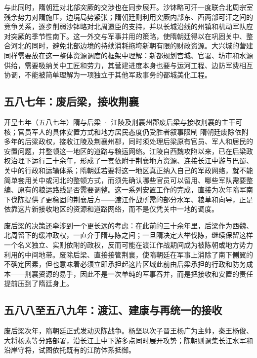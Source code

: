 与此同时，隋朝廷对北部突厥的交涉也在同步展开。沙钵略可汗一度联合北周宗室残余势力对隋施压，边境局势紧张；隋朝廷则利用突厥内部东、西两部可汗之间的竞争关系，逐步削弱沙钵略对北周遗臣的支持，并以长城沿线的州镇和机动军队应对突厥的季节性南下。这一外交与军事并用的策略，使隋朝廷得以在巩固关中、整合河北的同时，避免北部边境的持续消耗拖垮新朝有限的财政资源。大兴城的营建同样需要放在这一整体资源调度的框架中理解：新都规划宫城、官署、坊市和水源供给，需要吸纳关中工匠和劳力，其营建进度本身也要与运河工程、边防军费相互协调，不能被简单理解为一项独立于其他军政事务的都城美化工程。

\subsection{五八七年：废后梁，接收荆襄}

\begin{event}{}{开皇七年（五八七年）}{隋与后梁 · 江陵及荆襄州郡}{废后梁与接收荆襄的主干可核；官员军人的具体安置方式和地方居民态度仍受胜者叙事限制}
隋朝廷废除依附多年的后梁政权，接收江陵及荆襄州郡，同时须处理后梁原有官员、军人和居民的安置问题，并整顿这一地区的道路与粮运网络。江陵自西魏攻陷以来，已在后梁政权治理下运行三十余年，形成了一套依附于荆襄地方资源、连接长江中游与巴蜀、关中的行政和运输体系；隋朝廷若要将这一地区真正纳入自己的军政网络，就不能简单套用关中或河北的整顿方式，而须先确认哪些官员可以留用、哪些军队需要整编、原有的粮运路线是否需要调整。这一系列安置工作的完成，直接为次年隋军南下伐陈提供了更稳固的荆襄后方——渡江作战所需的部分水军、粮草和向导，正是依靠这片新接收地区的资源和道路网络，而不是仅凭关中一地的调度。
\end{event}

废后梁的决策还牵涉到一个更长远的考虑：在此前的三十余年里，后梁作为西魏、北周留下的缓冲政权，一直介于隋与陈之间；一旦隋决定大举伐陈，继续保留这样一个名义独立、实则依附的政权，反而可能在渡江作战期间成为被陈朝或地方势力利用的中间地带。废除后梁、直接接管荆襄，使隋朝廷在军事上消除了南下侧翼的不确定因素，但也意味着必须立即承担起这片区域此前由后梁承担的行政和防务成本——荆襄资源的易手，因此不是一次单纯的军事吞并，而是把接收和安置的责任提前压到了隋廷身上。

\subsection{五八八至五八九年：渡江、建康与再统一的接收}

废后梁次年，隋朝廷正式发动灭陈战争。杨坚以次子晋王杨广为主帅，秦王杨俊、大将杨素等分路部署，沿长江上中下游多点同时展开攻势；陈朝则调集长江水军和沿岸守将，试图依托既有的江防体系抵御。


